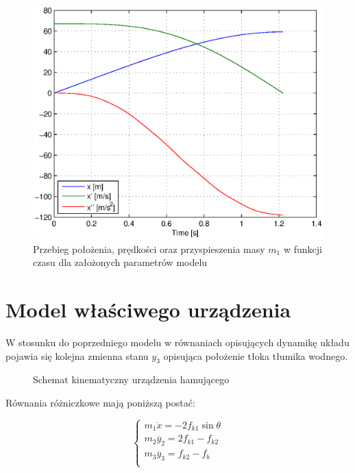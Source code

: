 \documentclass[12pt]{article}
\begin{document}
\begin{figure}[!htb]
	\begin{center}
		\includegraphics[width=12cm]{../res/img/wpr_hamsam.eps}
	\end{center} 
	\caption{Przebieg położenia, prędkości oraz
	przyspieszenia masy $m_1$ w funkcji czasu dla założonych parametrów modelu} 
	\label{rys:wpr_hamsam} 
\end{figure}

\newpage 

\section{Model właściwego urządzenia}

W stosunku do poprzedniego modelu w równaniach opisujących dynamikę układu
pojawia się kolejna zmienna stanu $y_3$ opisująca położenie tłoka tłumika
wodnego.

\begin{figure}[!htb]
	\begin{center}
		
		\caption{Schemat kinematyczny urządzenia hamującego}
		\label{rys:zad_hamsam_sch}
	\end{center}
\end{figure}

Równania różniczkowe mają poniższą postać:

\begin{equation}
	\begin{cases}
		m_1\ddot{x} = -2f_{k1}\sin\theta \\
		m_2\ddot{y_2} = 2f_{k1}-f_{k2} \\
		m_3\ddot{y_3} = f_{k2}-f_{b} \\
	\end{cases}
\end{equation}
\end{document}
